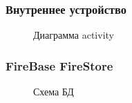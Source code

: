 \documentclass[xetex,mathserif,serif]{beamer}
\begin{document}
	\begin{frame}
		\frametitle{Внутреннее устройство}
		\begin{figure}[h]
            \caption{Диаграмма activity}
            \label{fig:image}
        \end{figure}
	\end{frame}	
	
	\begin{frame}
		\frametitle{FireBase FireStore}
		\begin{figure}[h]
            \caption{Схема БД}
            \label{fig:image}
        \end{figure}
	\end{frame}	
	
\end{document}
